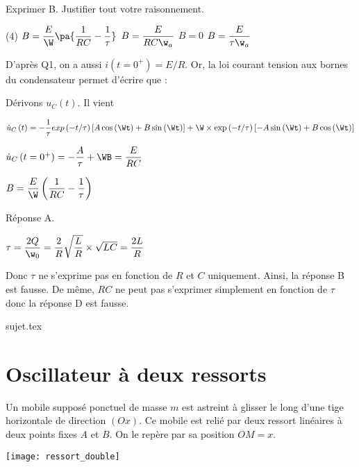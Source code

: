 \documentclass[a4paper, 12pt, final, garamond]{book}
\begin{document}
\QR
{Exprimer B. Justifier tout votre raisonnement.
	\begin{tasks}[label=\protect\fbox{\Alph*}, label-width=4ex,
			item-indent=1em, column-sep=4em](4)
		\task $B=\f{E}{\W}\pa{\f{1}{RC}-\f{1}{\tau}}$
		\task $B=\f{E}{{RC\w}_a}$
		\task $B=0$
		\task $B=\f{E}{{\tau \w}_a}$
	\end{tasks}
}
{
	D’après Q1, on a aussi $i\left(t=0^+\right)=E/R$.
	Or, la loi courant tension aux bornes du condensateur permet d’écrire que :


	Dérivons $u_C\left(t\right)$. Il vient

	${\dot{u}}_C\left(t\right)=-\f{1}{\tau}exp\left(-t/\tau\right)\left[A\cos{\left(\Wt\right)}+B\sin{\left(\Wt\right)}\right]+\W\times \exp\left(-t/\tau\right)\left[-A\sin{\left(\Wt\right)}+B\cos{\left(\Wt\right)}\right]$

	{ ${\dot{u}}_C\left(t=0^+\right)=-\f{A}{\tau}+\WB=\f{E}{RC}$}


	{ $B=\f{E}{\W}\left(\f{1}{RC}-\f{1}{\tau}\right)$}

	\medskip

	\noindent
	Réponse A.

	\bigskip

	 {$\tau=\f{2Q}{\w_0}=\f{2}{R}\sqrt{\f{L}{R}}\times\sqrt{LC}=\f{2L}{R}$}

	\noindent
	Donc $\tau$ ne s’exprime pas en fonction de $R$ et $C$ uniquement.
	Ainsi, la réponse B est fausse.
	De même, $RC$ ne peut pas s’exprimer simplement en fonction de $\tau$ donc la réponse D est fausse.
}

\resetQ
{sujet.tex}

\resetQ
\section{Oscillateur à deux ressorts}

Un mobile supposé ponctuel de masse $m$ est astreint à glisser le long d'une
tige horizontale de direction $(Ox)$. Ce mobile est relié par deux ressort
linéaires à deux points fixes $A$ et $B$. On le repère par sa position $OM = x$.

\begin{center}
	\texttt{[image: ressort\_double]}
\end{center}
\end{document}
